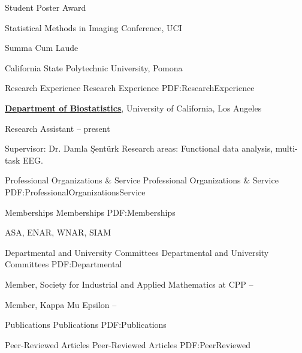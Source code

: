 \documentclass[letterpaper,MMMyyyy,nonstopmode]{simpleresumecv}
\begin{document}
\begin{Body}
Student Poster Award  \hfill {}
\begin{Detail} 
Statistical Methods in Imaging Conference, UCI
\end{Detail}
\BigGap

Summa Cum Laude \hfill {}
\begin{Detail} 
California State Polytechnic University, Pomona
\end{Detail}


\Section
{Research Experience}
{Research Experience}
{PDF:ResearchExperience}

\Entry
\href{http://www.example.com/my-institute}
{\textbf{Department of Biostatistics}},
University of California, Los Angeles

Research Assistant
\hfill
{} -- present
\begin{Detail}
\SubBulletItem
Supervisor:
Dr. Damla \c{S}ent\"{u}rk
\SubBulletItem
Research areas:
Functional data analysis, multi-task EEG.
\end{Detail}



\Section
{Professional Organizations\newline
\& Service}
{Professional Organizations \& Service}
{PDF:ProfessionalOrganizationsService}

\SubSection
{Memberships}
{Memberships}
{PDF:Memberships}

\BigGap

ASA, ENAR, WNAR, SIAM

\BigGap

\SubSection 
{Departmental and University Committees}
{Departmental and University Committees} 
{PDF:Departmental} 

\BigGap 

Member, Society for Industrial and Applied Mathematics at CPP \hfill {} -- 

Member, Kappa Mu Epsilon \hfill {} -- 



\Section
{Publications}
{Publications}
{PDF:Publications}

\SubSection
{Peer-Reviewed Articles}
{Peer-Reviewed Articles}
{PDF:PeerReviewed}


\end{Body}
\end{document}
